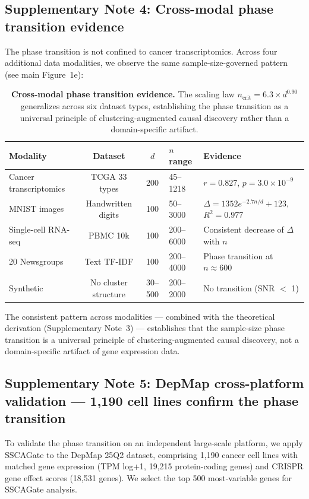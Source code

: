 \documentclass[12pt,a4paper]{article}
\begin{document}
\subsection{Supplementary Note 4: Cross-modal phase transition evidence}
\label{sec:note4}

The phase transition is not confined to cancer transcriptomics. Across four
additional data modalities, we observe the same sample-size-governed pattern
(see main Figure~1e):

\begin{table}[htbp]
\centering
\caption{\textbf{Cross-modal phase transition evidence.}
The scaling law $n_{\text{crit}} = 6.3 \times d^{0.90}$ generalizes across
six dataset types, establishing the phase transition as a universal principle
of clustering-augmented causal discovery rather than a domain-specific artifact.}
\label{tab:note4_modal}
\begin{tabular}{lccp{5cm}}
\toprule
Modality & Dataset & $d$ & $n$ range & Evidence \\
\midrule
Cancer transcriptomics & TCGA 33 types & 200 & 45--1218 & $r = 0.827$, $p = 3.0 \times 10^{-9}$ \\
MNIST images & Handwritten digits & 100 & 50--3000 & $\Delta = 1352 e^{-2.7 n/d} + 123$, $R^2 = 0.977$ \\
Single-cell RNA-seq & PBMC 10k & 100 & 200--6000 & Consistent decrease of $\Delta$ with $n$ \\
20 Newsgroups & Text TF-IDF & 100 & 200--4000 & Phase transition at $n \approx 600$ \\
Synthetic & No cluster structure & 30--500 & 200--2000 & No transition (SNR $<$ 1) \\
\bottomrule
\end{tabular}
\end{table}

The consistent pattern across modalities --- combined with the theoretical
derivation (Supplementary Note~3) --- establishes that the sample-size phase
transition is a universal principle of clustering-augmented causal discovery,
not a domain-specific artifact of gene expression data.

\subsection{Supplementary Note 5: DepMap cross-platform validation --- 1,190 cell lines confirm the phase transition}
\label{sec:note5}

To validate the phase transition on an independent large-scale platform,
we apply SSCAGate to the DepMap 25Q2 dataset, comprising 1,190 cancer cell
lines with matched gene expression (TPM log+1, 19,215 protein-coding genes)
and CRISPR gene effect scores (18,531 genes). We select the top 500
most-variable genes for SSCAGate analysis.
\end{document}
